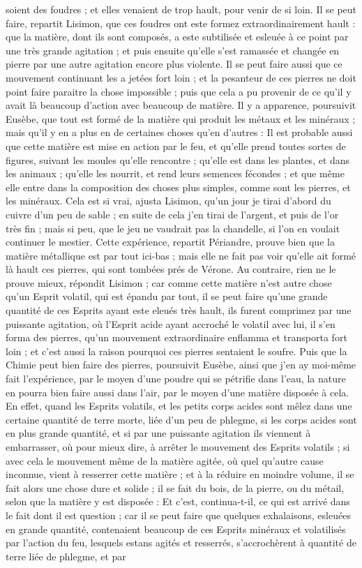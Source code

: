 \documentclass[a4paper, 11pt, oneside, polutonikogreek, french]{article}
\begin{document}
soient des foudres ; et elles venaient de trop hault, pour venir de si loin. Il se peut faire, repartit Lisimon, que ces foudres ont este formez extraordinairement hault : que la matière, dont ils sont composés, a este subtilisée et esleuée à ce point par une très grande agitation ; et puis ensuite qu'elle s'est ramassée et changée en pierre par une autre agitation encore plus violente. Il se peut faire aussi que ce mouvement continuant les a jetées fort loin ; et la pesanteur de ces pierres ne doit point faire paraitre la chose impossible ; puis que cela a pu provenir de ce qu'il y avait là beaucoup d'action avec beaucoup de matière. Il y a apparence, poursuivit Eusèbe, que tout est formé de la matière qui produit les métaux et les minéraux ; mais qu'il y en a plus en de certaines choses qu'en d'autres : Il est probable aussi que cette matière est mise en action par le feu, et qu'elle prend toutes sortes de figures, suivant les moules qu'elle rencontre ; qu'elle est dans les plantes, et dans les animaux ; qu'elle les nourrit, et rend leurs semences fécondes ; et que même elle entre dans la composition des choses plus simples, comme sont les pierres, et les minéraux. Cela est si vrai, ajusta Lisimon, qu'un jour je tirai d'abord du cuivre d'un peu de sable ; en suite de cela j'en tirai de l'argent, et puis de l'or très fin ; mais si peu, que le jeu ne vaudrait pas la chandelle, si l'on en voulait continuer le mestier. Cette expérience, repartit Périandre, prouve bien que la matière métallique est par tout ici-bas ; mais elle ne fait pas voir qu'elle ait formé là hault ces pierres, qui sont tombées prés de Vérone. Au contraire, rien ne le prouve mieux, répondit Lisimon ; car comme cette matière n'est autre chose qu'un Esprit volatil, qui est épandu par tout, il se peut faire qu'une grande quantité de ces Esprits ayant este eleués très hault, ils furent comprimez par une puissante agitation, où l'Esprit acide ayant accroché le volatil avec lui, il s'en forma des pierres, qu'un mouvement extraordinaire enflamma et transporta fort loin ; et c'est aussi la raison pourquoi ces pierres sentaient le soufre. Puis que la Chimie peut bien faire des pierres, poursuivit Eusèbe, ainsi que j'en ay moi-même fait l'expérience, par le moyen d'une poudre qui se pétrifie dans l'eau, la nature en pourra bien faire aussi dans l'air, par le moyen d'une matière disposée à cela. En effet, quand les Esprits volatils, et les petits corps acides sont mêlez dans une certaine quantité de terre morte, liée d'un peu de phlegme, si les corps acides sont en plus grande quantité, et si par une puissante agitation ils viennent à embarrasser, où pour mieux dire, à arrêter le mouvement des Esprits volatils ; si avec cela le mouvement même de la matière agitée, où quel qu’autre cause inconnue, vient à resserrer cette matière ; et à la réduire en moindre volume, il se fait alors une chose dure et solide ; il se fait du bois, de la pierre, ou du métail, selon que la matière y est disposée : Et c'est, continua-t-il, ce qui est arrivé dans le fait dont il est question ; car il se peut faire que quelques exhalaisons, esleuées en grande quantité, contenaient beaucoup de ces Esprits minéraux et volatilisés par l'action du feu, lesquels estans agités et resserrés, s'accrochèrent à quantité de terre liée de phlegme, et par 
\end{document}
